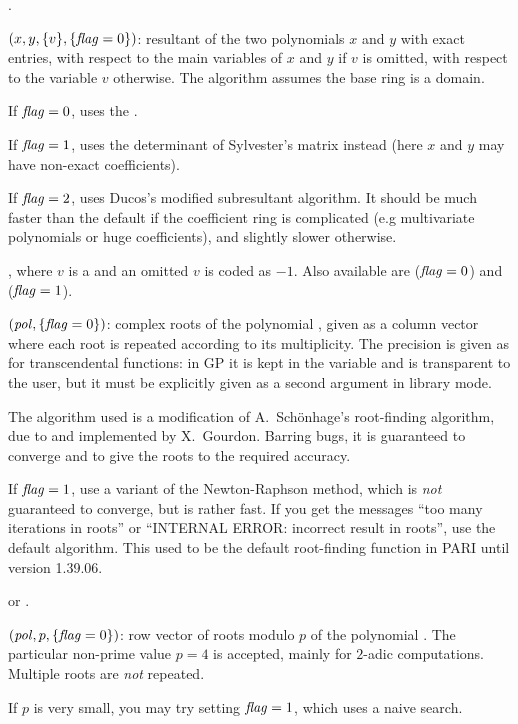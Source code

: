 .

$(x,y,\{v\},\{\hbox{\it f\kern0pt lag\/}=0\})$: resultant of the two
polynomials $x$ and $y$ with exact entries, with respect to the main
variables of $x$ and $y$ if $v$ is omitted, with respect to the variable $v$
otherwise. The algorithm assumes the base ring is a domain.

If $\hbox{\it f\kern0pt lag\/}=0$, uses the .

If $\hbox{\it f\kern0pt lag\/}=1$, uses the determinant of Sylvester's matrix instead (here $x$ and
$y$ may have non-exact coefficients).

If $\hbox{\it f\kern0pt lag\/}=2$, uses Ducos's modified subresultant algorithm. It should be much
faster than the default if the coefficient ring is complicated (e.g
multivariate polynomials or huge coefficients), and slightly slower
otherwise.

, where $v$ is a  and an omitted $v$
is coded as $-1$. Also available are  ($\hbox{\it f\kern0pt lag\/}=0$) and
 ($\hbox{\it f\kern0pt lag\/}=1$).

$(\hbox{\it pol\/},\{\hbox{\it f\kern0pt lag\/}=0\})$: complex roots of the polynomial
, given as a column vector where each root is repeated according to
its multiplicity. The precision is given as for transcendental functions: in
GP it is kept in the variable  and is transparent to the
user, but it must be explicitly given as a second argument in library mode.

The algorithm used is a modification of A.~Sch\"onhage's
root-finding algorithm, due to and implemented by X.~Gourdon. Barring bugs, it
is guaranteed to converge and to give the roots to the required accuracy.

If $\hbox{\it f\kern0pt lag\/}=1$, use a variant of the Newton-Raphson method, which is \emph{not}
guaranteed to converge, but is rather fast. If you get the messages ``too
many iterations in roots'' or ``INTERNAL ERROR: incorrect result in roots'',
use the default algorithm. This used to be the default root-finding function in
PARI until version 1.39.06.

 or .

$(\hbox{\it pol\/},p,\{\hbox{\it f\kern0pt lag\/}=0\})$: row vector of roots modulo
$p$ of the polynomial . The particular non-prime value $p=4$ is
accepted, mainly for $2$-adic computations. Multiple roots are \emph{not}
repeated.

If $p$ is very small, you may try setting $\hbox{\it f\kern0pt lag\/}=1$, which uses a naive search.

